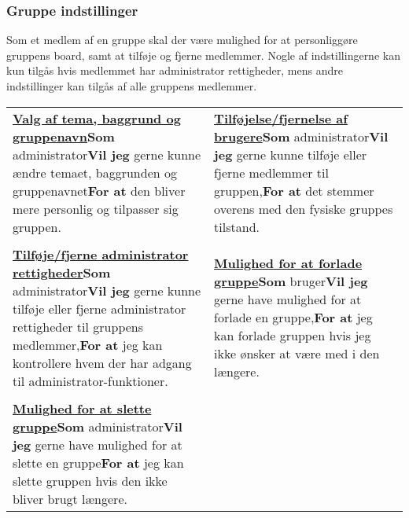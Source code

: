 \subsubsection{Gruppe indstillinger}

\noindent Som et medlem af en gruppe skal der være mulighed for at personliggøre gruppens board, samt at tilføje og fjerne medlemmer. Nogle af indstillingerne kan kun tilgås hvis medlemmet har administrator rettigheder, mens andre indstillinger kan tilgås af alle gruppens medlemmer.\newline

\begin{tabular}{p{2.5in}p{2.5in}}
\textbf{\underline{Valg af tema, baggrund og gruppenavn}}\newline \textbf{Som} administrator\newline \textbf{Vil jeg} gerne kunne ændre temaet, baggrunden og gruppenavnet\newline \textbf{For at} den bliver mere personlig og tilpasser sig gruppen. & 

\textbf{\underline{Tilføjelse/fjernelse af brugere}}\newline \textbf{Som} administrator\newline \textbf{Vil jeg} gerne kunne tilføje eller fjerne medlemmer til gruppen,\newline \textbf{For at} det stemmer overens med den fysiske gruppes tilstand.  \\\\

\textbf{\underline{Tilføje/fjerne administrator rettigheder}}\newline \textbf{Som} administrator\newline \textbf{Vil jeg} gerne kunne tilføje eller fjerne administrator rettigheder til gruppens medlemmer,\newline \textbf{For at} jeg kan kontrollere hvem der har adgang til administrator-funktioner.  & 

\textbf{\underline{Mulighed for at forlade gruppe}}\newline \textbf{Som} bruger\newline \textbf{Vil jeg} gerne have mulighed for at forlade en gruppe,\newline \textbf{For at} jeg kan forlade gruppen hvis jeg ikke ønsker at være med i den længere.  \\\\  

\textbf{\underline{Mulighed for at slette gruppe}}\newline \textbf{Som} administrator\newline \textbf{Vil jeg} gerne have mulighed for at slette en gruppe\newline \textbf{For at} jeg kan slette gruppen hvis den ikke bliver brugt længere.  &


\end{tabular}
